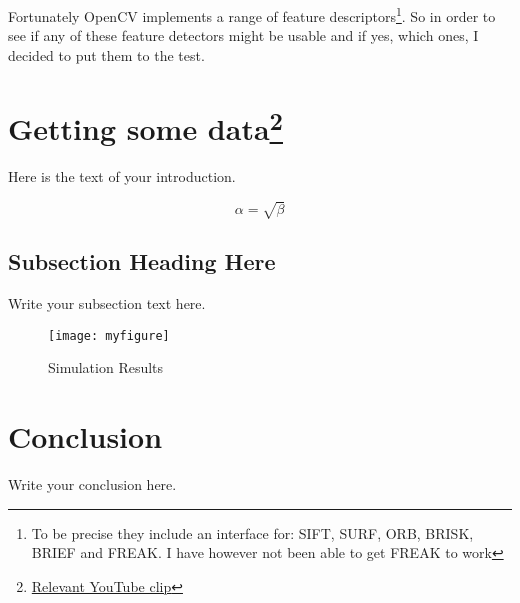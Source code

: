 \documentclass{article}
\begin{document}
Fortunately OpenCV implements a range of feature descriptors\footnote{To be 
precise they include an interface for: SIFT, SURF, ORB, BRISK, BRIEF and FREAK.  
I have however not been able to get FREAK to work}. So in order to see if any 
of these feature detectors might be usable and if yes, which ones, I decided to 
put them to the test.

\section{Getting some data\footnote{%
\href{http://www.youtube.com/watch?v=FQ3UrLQP2ok}{Relevant YouTube clip}}}





Here is the text of your introduction.

\begin{equation}
    \label{simple_equation}
    \alpha = \sqrt{ \beta }
\end{equation}

\subsection{Subsection Heading Here}
Write your subsection text here.

\begin{figure}
    \centering
    \texttt{[image: myfigure]}
    \caption{Simulation Results}
    \label{simulationfigure}
\end{figure}

\section{Conclusion}
Write your conclusion here.
\end{document}
